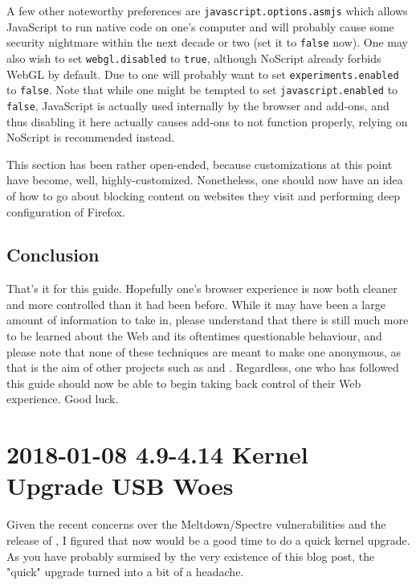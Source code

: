 \documentclass{article}
\begin{document}
A few other noteworthy preferences are \texttt{javascript.options.asmjs} which allows JavaScript to run native code on one's computer and will probably cause some security nightmare within the next decade or two (set it to \texttt{false} now).  One may also wish to set \texttt{webgl.disabled} to \texttt{true}, although NoScript already forbids WebGL by default.  Due to  one will probably want to set \texttt{experiments.enabled} to \texttt{false}.  Note that while one might be tempted to set \texttt{javascript.enabled} to \texttt{false}, JavaScript is actually used internally by the browser and add-ons, and thus disabling it here actually causes add-ons to not function properly, relying on NoScript is recommended instead.

This section has been rather open-ended, because customizations at this point have become, well, highly-customized.  Nonetheless, one should now have an idea of how to go about blocking content on websites they visit and performing deep configuration of Firefox.

\subsection{Conclusion}
That's it for this guide.  Hopefully one's browser experience is now both cleaner and more controlled than it had been before.  While it may have been a large amount of information to take in, please understand that there is still much more to be learned about the Web and its oftentimes questionable behaviour, and please note that none of these techniques are meant to make one anonymous, as that is the aim of other projects such as  and .  Regardless, one who has followed this guide should now be able to begin taking back control of their Web experience.  Good luck.


\section{2018-01-08 4.9-4.14 Kernel Upgrade USB Woes}
Given the recent concerns over the Meltdown/Spectre vulnerabilities and the release of , I figured that now would be a good time to do a quick kernel upgrade.  As you have probably surmised by the very existence of this blog post, the "quick" upgrade turned into a bit of a headache.
\end{document}
